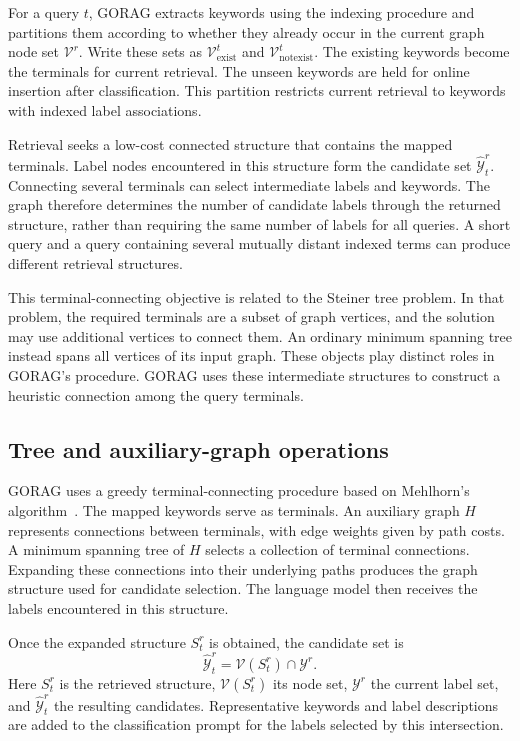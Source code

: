 For a query $t$, GORAG extracts keywords using the indexing procedure and partitions them according to whether they already occur in the current graph node set $\mathcal{V}^r$. Write these sets as $\mathcal{V}_{\mathrm{exist}}^t$ and $\mathcal{V}_{\mathrm{notexist}}^t$. The existing keywords become the terminals for current retrieval. The unseen keywords are held for online insertion after classification. This partition restricts current retrieval to keywords with indexed label associations.

Retrieval seeks a low-cost connected structure that contains the mapped terminals. Label nodes encountered in this structure form the candidate set $\widehat{\mathcal{Y}}_t^r$. Connecting several terminals can select intermediate labels and keywords. The graph therefore determines the number of candidate labels through the returned structure, rather than requiring the same number of labels for all queries. A short query and a query containing several mutually distant indexed terms can produce different retrieval structures.

This terminal-connecting objective is related to the Steiner tree problem. In that problem, the required terminals are a subset of graph vertices, and the solution may use additional vertices to connect them. An ordinary minimum spanning tree instead spans all vertices of its input graph. These objects play distinct roles in GORAG's procedure. GORAG uses these intermediate structures to construct a heuristic connection among the query terminals.

\subsection{Tree and auxiliary-graph operations}
\label{sec:gorag:algorithm}

GORAG uses a greedy terminal-connecting procedure based on Mehlhorn's algorithm~\cite{gorag-mehlhorn1988faster}. The mapped keywords serve as terminals. An auxiliary graph $H$ represents connections between terminals, with edge weights given by path costs. A minimum spanning tree of $H$ selects a collection of terminal connections. Expanding these connections into their underlying paths produces the graph structure used for candidate selection. The language model then receives the labels encountered in this structure.

Once the expanded structure $S_t^r$ is obtained, the candidate set is
\begin{equation}
\widehat{\mathcal{Y}}_t^r=\mathcal{V}(S_t^r)\cap\mathcal{Y}^r.
\label{eq:gorag:candidates}
\end{equation}
Here $S_t^r$ is the retrieved structure, $\mathcal V(S_t^r)$ its node set, $\mathcal Y^r$ the current label set, and $\widehat{\mathcal Y}_t^r$ the resulting candidates. Representative keywords and label descriptions are added to the classification prompt for the labels selected by this intersection.

